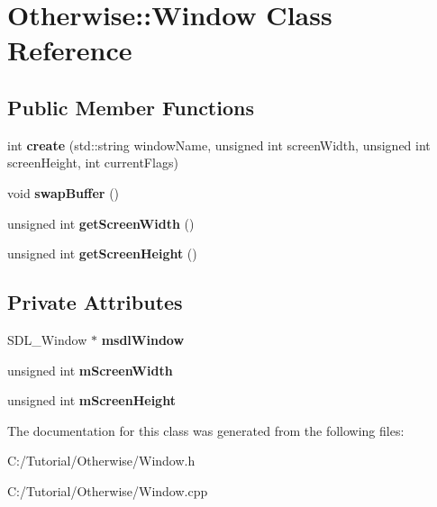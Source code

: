 \hypertarget{class_otherwise_1_1_window}{}\section{Otherwise\+:\+:Window Class Reference}
\label{class_otherwise_1_1_window}
\subsection*{Public Member Functions}
\begin{DoxyCompactItemize}
\item 
\mbox{\label{class_otherwise_1_1_window_ab755d6f59aebf9d087586fa92ea8cc73}} 
int {\bfseries create} (std\+::string window\+Name, unsigned int screen\+Width, unsigned int screen\+Height, int current\+Flags)
\item 
\mbox{\label{class_otherwise_1_1_window_a354b7c67f2a4813bca0fcea92b2a6b3d}} 
void {\bfseries swap\+Buffer} ()
\item 
\mbox{\label{class_otherwise_1_1_window_afa79493c7a1c00496ad58dc54ab5d3d5}} 
unsigned int {\bfseries get\+Screen\+Width} ()
\item 
\mbox{\label{class_otherwise_1_1_window_a3d383ffd5c590a7f28cb8a6e3b5c13c6}} 
unsigned int {\bfseries get\+Screen\+Height} ()
\end{DoxyCompactItemize}
\subsection*{Private Attributes}
\begin{DoxyCompactItemize}
\item 
\mbox{\label{class_otherwise_1_1_window_ab33aeb79ed0f4c064fbb5ae933873ae2}} 
S\+D\+L\+\_\+\+Window $\ast$ {\bfseries msdl\+Window}
\item 
\mbox{\label{class_otherwise_1_1_window_a18e8ef671f9ab877aa7a692bb00fee8e}} 
unsigned int {\bfseries m\+Screen\+Width}
\item 
\mbox{\label{class_otherwise_1_1_window_a44bb1a188b0b65f07f65ecf733749d06}} 
unsigned int {\bfseries m\+Screen\+Height}
\end{DoxyCompactItemize}


The documentation for this class was generated from the following files\+:\begin{DoxyCompactItemize}
\item 
C\+:/\+Tutorial/\+Otherwise/Window.\+h\item 
C\+:/\+Tutorial/\+Otherwise/Window.\+cpp\end{DoxyCompactItemize}
